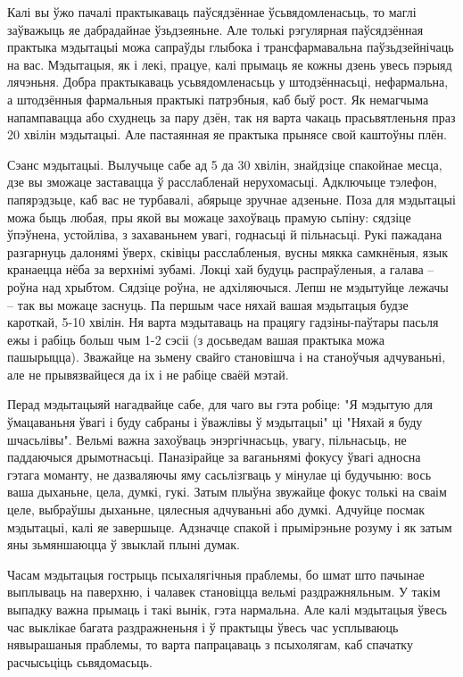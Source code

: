 Калі вы ўжо пачалі практыкаваць паўсядзённае ўсьвядомленасьць, то маглі заўважыць яе дабрадайнае ўзьдзеяньне. Але толькі рэгулярная паўсядзённая практыка мэдытацыі можа сапраўды глыбока і трансфармавальна паўзьдзейнічаць на вас. Мэдытацыя, як і лекі, працуе, калі прымаць яе кожны дзень увесь пэрыяд лячэньня. Добра практыкаваць усьвядомленасьць у штодзённасьці, нефармальна, а штодзённыя фармальныя практыкі патрэбныя, каб быў рост. Як немагчыма напампавацца або схуднець за пару дзён, так ня варта чакаць прасьвятленьня праз 20 хвілін мэдытацыі. Але пастаянная яе практыка прынясе свой каштоўны плён.

Сэанс мэдытацыі. Вылучыце сабе ад 5 да 30 хвілін, знайдзіце спакойнае месца, дзе вы зможаце заставацца ў расслабленай нерухомасьці. Адключыце тэлефон, папярэдзьце, каб вас не турбавалі, абярыце зручнае адзеньне. Поза для мэдытацыі можа быць любая, пры якой вы можаце захоўваць прамую сьпіну: сядзіце ўпэўнена, устойліва, з захаваньнем увагі, годнасьці й пільнасьці. Рукі пажадана разгарнуць далонямі ўверх, сківіцы расслабленыя, вусны мякка самкнёныя, язык кранаецца нёба за верхнімі зубамі. Локці хай будуць распраўленыя, а галава – роўна над хрыбтом. Сядзіце роўна, не адхіляючыся. Лепш не мэдытуйце лежачы – так вы можаце заснуць. Па першым часе няхай вашая мэдытацыя будзе кароткай, 5-10 хвілін. Ня варта мэдытаваць на працягу гадзіны-паўтары пасьля ежы і рабіць больш чым 1-2 сэсіі (з досьведам вашая практыка можа пашырыцца). Зважайце на зьмену свайго становішча і на станоўчыя адчуваньні, але не прывязвайцеся да іх і не рабіце сваёй мэтай. 

Перад мэдытацыяй нагадвайце сабе, для чаго вы гэта робіце: "Я мэдытую для ўмацаваньня ўвагі і буду сабраны і ўважлівы ў мэдытацыі" ці "Няхай я буду шчасьлівы". Вельмі важна захоўваць энэргічнасьць, увагу, пільнасьць, не паддаючыся дрымотнасьці. Паназірайце за ваганьнямі фокусу ўвагі адносна гэтага моманту, не дазваляючы яму сасьлізгваць у мінулае ці будучыню: вось ваша дыханьне, цела, думкі, гукі. Затым плыўна звужайце фокус толькі на сваім целе, выбраўшы дыханьне, цялесныя адчуваньні або думкі. Адчуйце посмак мэдытацыі, калі яе завершыце. Адзначце спакой і прымірэньне розуму і як затым яны зьмяншаюцца ў звыклай плыні думак.

Часам мэдытацыя гострыць псыхалягічныя праблемы, бо шмат што пачынае выплываць на паверхню, і чалавек становіцца вельмі раздражняльным. У такім выпадку важна прымаць і такі вынік, гэта нармальна. Але калі мэдытацыя ўвесь час выклікае багата раздражненьня і ў практыцы ўвесь час усплываюць нявырашаныя праблемы, то варта папрацаваць з псыхолягам, каб спачатку расчысьціць сьвядомасьць.

